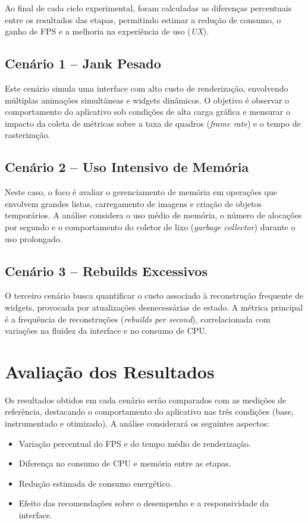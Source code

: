 \documentclass[12pt,a4paper,oneside]{abntex2}
\begin{document}
Ao final de cada ciclo experimental, foram calculadas as diferenças percentuais entre os resultados das etapas, permitindo estimar a redução de consumo, o ganho de FPS e a melhoria na experiência de uso (\textit{UX}).

\subsection{Cenário 1 – Jank Pesado}

Este cenário simula uma interface com alto custo de renderização, envolvendo múltiplas animações simultâneas e widgets dinâmicos.  
O objetivo é observar o comportamento do aplicativo sob condições de alta carga gráfica e mensurar o impacto da coleta de métricas sobre a taxa de quadros (\textit{frame rate}) e o tempo de rasterização.

\subsection{Cenário 2 – Uso Intensivo de Memória}

Neste caso, o foco é avaliar o gerenciamento de memória em operações que envolvem grandes listas, carregamento de imagens e criação de objetos temporários.  
A análise considera o uso médio de memória, o número de alocações por segundo e o comportamento do coletor de lixo (\textit{garbage collector}) durante o uso prolongado.

\subsection{Cenário 3 – Rebuilds Excessivos}

O terceiro cenário busca quantificar o custo associado à reconstrução frequente de widgets, provocada por atualizações desnecessárias de estado.  
A métrica principal é a frequência de reconstruções (\textit{rebuilds per second}), correlacionada com variações na fluidez da interface e no consumo de CPU.

\section{Avaliação dos Resultados}

Os resultados obtidos em cada cenário serão comparados com as medições de referência, destacando o comportamento do aplicativo nas três condições (base, instrumentado e otimizado).  
A análise considerará os seguintes aspectos:

\begin{itemize}
  \item Variação percentual do FPS e do tempo médio de renderização.
  \item Diferença no consumo de CPU e memória entre as etapas.
  \item Redução estimada de consumo energético.
  \item Efeito das recomendações sobre o desempenho e a responsividade da interface.
\end{itemize}
\end{document}
